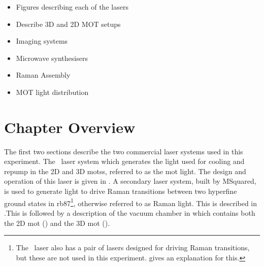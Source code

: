 \begin{itemize}\item Figures describing each of the lasers
    \item Describe 3D and 2D MOT setups  
    \item Imaging systems
    \item Microwave synthesisers
    \item Raman Assembly
    \item MOT light distribution
\end{itemize}
\section{Chapter Overview}\label{sec:setup_overview}
The first two sections describe the two commercial laser systems used in this experiment. The \Muquans\ laser system which generates the light used for cooling and repump in the 2D and 3D \acp{mots}, referred to as the \acs{mot} light. The design and operation of this laser is given in . A secondary laser system, built by MSquared, is used to generate light to drive Raman transitions between two hyperfine ground states in \ac{rb87}\footnote{The \Muquans\ laser also has a pair of lasers designed for driving Raman transitions, but these are not used in this experiment.  gives an explanation for this.}, otherwise referred to as Raman light. This is described in .This is followed by a description of the vacuum chamber in  which contains both the 2D \ac{mot} () and the 3D \ac{mot} ().  

